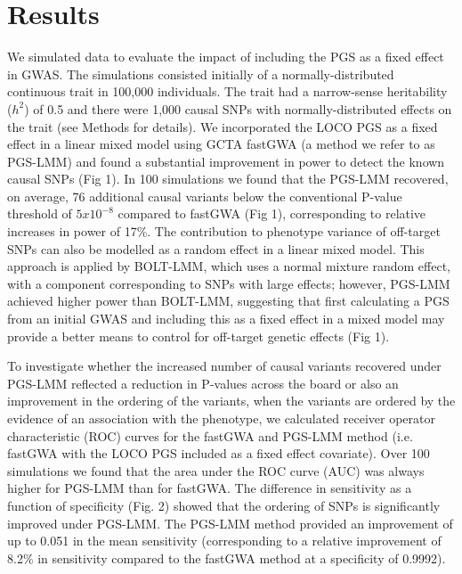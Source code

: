 \documentclass[doublespacing]{bmcart}
\begin{document}
\section*{Results}
We simulated data to evaluate the impact of including the PGS as a fixed effect in GWAS. The simulations consisted initially of a normally-distributed continuous trait in 100,000 individuals. The trait had a narrow-sense heritability ($h^2$) of 0.5 and there were 1,000 causal SNPs with normally-distributed effects on the trait (see Methods for details). We incorporated the LOCO PGS as a fixed effect in a linear mixed model using GCTA fastGWA \cite{jiang2019resource} (a method we refer to as PGS-LMM) and found a substantial improvement in power to detect the known causal SNPs (Fig 1). In 100 simulations we found that the PGS-LMM recovered, on average, 76 additional causal variants below the conventional P-value threshold of $5x10^{-8}$ compared to fastGWA (Fig 1), corresponding to relative increases in power of 17\%. The contribution to phenotype variance of off-target SNPs can also be modelled as a random effect in a linear mixed model. This approach is applied by BOLT-LMM, which uses a normal mixture random effect, with a component corresponding to SNPs with large effects; however, PGS-LMM achieved higher power than BOLT-LMM, suggesting that first calculating a PGS from an initial GWAS and including this as a fixed effect in a mixed model may provide a better means to control for off-target genetic effects (Fig 1).  \par 

To investigate whether the increased number of causal variants recovered under PGS-LMM reflected a reduction in P-values across the board or also an improvement in the ordering of the variants, when the variants are ordered by the evidence of an association with the phenotype, we calculated receiver operator characteristic (ROC) curves for the fastGWA and PGS-LMM method (i.e. fastGWA with the LOCO PGS included as a fixed effect covariate). Over 100 simulations we found that the area under the ROC curve (AUC) was always higher for PGS-LMM than for fastGWA. The difference in sensitivity as a function of specificity (Fig. 2) showed that the ordering of SNPs is significantly improved under PGS-LMM. The PGS-LMM method provided an improvement of up to 0.051 in the mean sensitivity (corresponding to a relative improvement of 8.2\% in sensitivity compared to the fastGWA method at a specificity of 0.9992).
\end{document}
